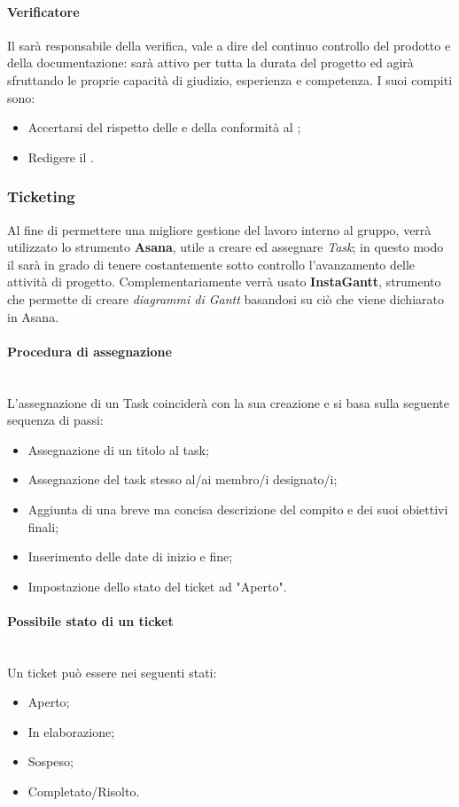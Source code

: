 \paragraph{Verificatore}
Il \ver{} sarà responsabile della verifica, vale a dire del continuo controllo del prodotto e della documentazione: sarà attivo per tutta la durata del progetto ed agirà sfruttando le proprie capacità di giudizio, esperienza e competenza. I suoi compiti sono:
\begin{itemize}
\item Accertarsi del rispetto delle \NdP{} e della conformità al \PdQ{};
\item Redigere il \PdQ{}.
\end{itemize}

\subsubsection{Ticketing}
Al fine di permettere una migliore gestione del lavoro interno al gruppo, verrà utilizzato lo strumento \textbf{Asana}, utile a creare ed assegnare \emph{Task}; in questo modo il \RdP  sarà in grado di tenere costantemente sotto controllo l'avanzamento delle attività di progetto. Complementariamente verrà usato \textbf{InstaGantt}, strumento che permette di creare \emph{diagrammi di Gantt} basandosi su ciò che viene dichiarato in Asana.
\paragraph{Procedura di assegnazione}
~\\L'assegnazione di un Task coinciderà con la sua creazione e si basa sulla seguente sequenza di passi:
\begin{itemize}
\item Assegnazione di un titolo al task;
\item Assegnazione del task stesso al/ai membro/i designato/i;
\item Aggiunta di una breve ma concisa descrizione del compito e dei suoi obiettivi finali;
\item Inserimento delle date di inizio e fine;
\item Impostazione dello stato del ticket ad "Aperto".
\end{itemize}

\paragraph{Possibile stato di un ticket}
~\\Un ticket può essere nei seguenti stati:
\begin{itemize}
\item Aperto;
\item In elaborazione;
\item Sospeso;
\item Completato/Risolto.
\end{itemize}

